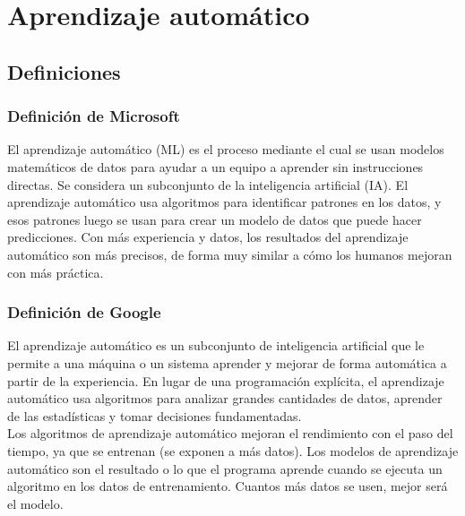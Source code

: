 \section{Aprendizaje automático}

\subsection*{Definiciones}

\subsubsection*{Definición de Microsoft \cite{MLMicros}}

El aprendizaje automático (ML) es el proceso mediante el cual se usan modelos matemáticos 
de datos para ayudar a un equipo a aprender sin instrucciones directas. Se considera 
un subconjunto de la inteligencia artificial (IA). El aprendizaje automático usa algoritmos 
para identificar patrones en los datos, y esos patrones luego se usan para crear un modelo 
de datos que puede hacer predicciones. Con más experiencia y datos, los resultados del 
aprendizaje automático son más precisos, de forma muy similar a cómo los humanos mejoran 
con más práctica.


\subsubsection*{Definición de Google \cite{MLGoogle}}

El aprendizaje automático es un subconjunto de inteligencia artificial que le permite a 
una máquina o un sistema aprender y mejorar de forma automática a partir de la experiencia. 
En lugar de una programación explícita, el aprendizaje automático usa algoritmos para 
analizar grandes cantidades de datos, aprender de las estadísticas y tomar decisiones 
fundamentadas. \\ 

Los algoritmos de aprendizaje automático mejoran el rendimiento con el paso del tiempo,
ya que se entrenan (se exponen a más datos). Los modelos de aprendizaje automático son 
el resultado o lo que el programa aprende cuando se ejecuta un algoritmo en los datos de 
entrenamiento. Cuantos más datos se usen, mejor será el modelo. 


